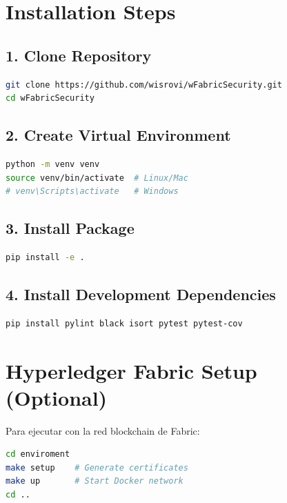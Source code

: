 \documentclass[12pt,a4paper]{report}
\begin{document}
\section{Installation Steps}

\subsection{1. Clone Repository}

\begin{lstlisting}[language=bash, caption={Clone Repository}]
git clone https://github.com/wisrovi/wFabricSecurity.git
cd wFabricSecurity
\end{lstlisting}

\subsection{2. Create Virtual Environment}

\begin{lstlisting}[language=bash, caption={Create Virtual Environment}]
python -m venv venv
source venv/bin/activate  # Linux/Mac
# venv\Scripts\activate   # Windows
\end{lstlisting}

\subsection{3. Install Package}

\begin{lstlisting}[language=bash, caption={Install Package}]
pip install -e .
\end{lstlisting}

\subsection{4. Install Development Dependencies}

\begin{lstlisting}[language=bash, caption={Install Dev Dependencies}]
pip install pylint black isort pytest pytest-cov
\end{lstlisting}

\section{Hyperledger Fabric Setup (Optional)}

Para ejecutar con la red blockchain de Fabric:

\begin{lstlisting}[language=bash, caption={Setup Fabric Network}]
cd enviroment
make setup    # Generate certificates
make up       # Start Docker network
cd ..
\end{lstlisting}
\end{document}
